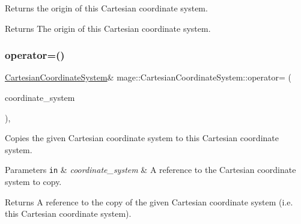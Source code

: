 Returns the origin of this Cartesian coordinate system.

\begin{DoxyReturn}{Returns}
The origin of this Cartesian coordinate system. 
\end{DoxyReturn}
\hypertarget{structmage_1_1_cartesian_coordinate_system_ab7c682092e8d022b2b78ecfb5238d5fa}{}\label{structmage_1_1_cartesian_coordinate_system_ab7c682092e8d022b2b78ecfb5238d5fa} 
\subsubsection{\texorpdfstring{operator=()}{operator=()}\hspace{0.1cm}{\footnotesize\ttfamily [1/2]}}
{\footnotesize\ttfamily \hyperlink{structmage_1_1_cartesian_coordinate_system}{Cartesian\+Coordinate\+System}\& mage\+::\+Cartesian\+Coordinate\+System\+::operator= (\begin{DoxyParamCaption}\item[{const \hyperlink{structmage_1_1_cartesian_coordinate_system}{Cartesian\+Coordinate\+System} \&}]{coordinate\+\_\+system }\end{DoxyParamCaption})\hspace{0.3cm}{\ttfamily [default]}, {\ttfamily [noexcept]}}

Copies the given Cartesian coordinate system to this Cartesian coordinate system.


\begin{DoxyParams}[1]{Parameters}
\mbox{\tt in}  & {\em coordinate\+\_\+system} & A reference to the Cartesian coordinate system to copy. \\
\hline
\end{DoxyParams}
\begin{DoxyReturn}{Returns}
A reference to the copy of the given Cartesian coordinate system (i.\+e. this Cartesian coordinate system). 
\end{DoxyReturn}
\hypertarget{structmage_1_1_cartesian_coordinate_system_ab435fab99df68ab3a91240900508bfcd}{}\label{structmage_1_1_cartesian_coordinate_system_ab435fab99df68ab3a91240900508bfcd} 
